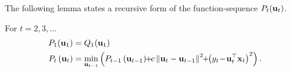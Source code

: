 The
following lemma states a recursive form of the function-sequence $P_t(\mathbf{u}_{t})$.
\begin{lemma}
\label{lem:lemma11}
For $t=2,3,\ldots$
%
\begin{align*}
P_1(\vui1)&=Q_1(\vui1)\\
 P_{t}\left(\vui{t}\right)&=
\min_{\vui{t-1}}\left(P_{t-1}\left(\vui{t-1}\right)
\!\!+\!\!c\left\Vert
    \vui{t}-\vui{t-1}\right\Vert
  ^{2} \!\!+\!\!\left(y_{t}\!-\!\vuti{t}\vxi{t}\right)^{2}\right).
\end{align*}
 \end{lemma}
